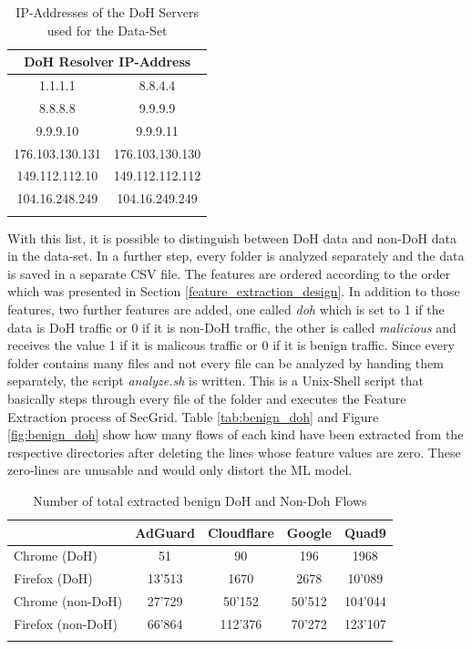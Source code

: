 \begin{center}
\begin{longtable}{ |c|c| }
\hline
\multicolumn{2}{|c|}{DoH Resolver IP-Address} \\
\hline
1.1.1.1 & 8.8.4.4 \\
\hline
8.8.8.8 & 9.9.9.9 \\
\hline
9.9.9.10 & 9.9.9.11 \\
\hline
176.103.130.131 & 176.103.130.130 \\
\hline
149.112.112.10 & 149.112.112.112 \\
\hline
104.16.248.249 & 104.16.249.249 \\
\hline
\caption{IP-Addresses of the DoH Servers used for the Data-Set \cite{CIRA-CIC-DoHBrw-2020}}
\end{longtable}
\label{tab:doh_ips}
\end{center}

With this list, it is possible to distinguish between DoH data and non-DoH data in the data-set. In a further step, every folder is analyzed separately and the data is saved in a separate CSV file. The features are ordered according to the order which was presented in Section \ref{feature_extraction_design}. In addition to those features, two further features are added, one called \textit{doh} which is set to 1 if the data is DoH traffic or 0 if it is non-DoH traffic, the other is called \textit{malicious} and receives the value 1 if it is malicous traffic or 0 if it is benign traffic. Since every folder contains many files and not every file can be analyzed by handing them separately, the script \textit{analyze.sh} is written. This is a Unix-Shell script that basically steps through every file of the folder and executes the Feature Extraction process of SecGrid. Table \ref{tab:benign_doh} and Figure \ref{fig:benign_doh} show how many flows of each kind have been extracted from the respective directories after deleting the lines whose feature values are zero. These zero-lines are unusable and would only distort the ML model.

\begin{center}
\begin{longtable}{ |l|c|c|c|c| }
\hline
 & AdGuard & Cloudflare & Google & Quad9 \\
\hline
Chrome (DoH) & 51 & 90 & 196 & 1968 \\
Firefox (DoH) & 13'513 & 1670 & 2678 & 10'089 \\
\hline
Chrome (non-DoH) & 27'729 & 50'152 & 50'512 & 104'044 \\
Firefox (non-DoH) & 66'864 & 112'376 & 70'272 & 123'107 \\
\hline
\caption{Number of total extracted benign DoH and Non-Doh Flows}
\end{longtable}
\label{tab:benign_doh}
\end{center}

